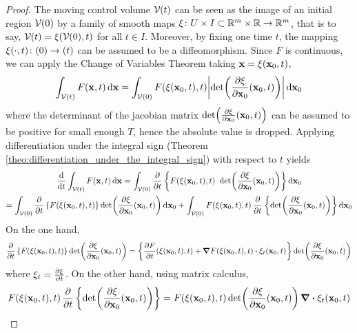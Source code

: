 \begin{proof}
	The moving control volume $\mathcal{V}_{}(t)$ can be seen as the image of an initial region $\mathcal{V}_{}(0)$ by a family of smooth maps $\xi \colon U \times I \subset \mathbb{R}^m \times \mathbb{R} \rightarrow \mathbb{R}^m$, that is to say, $\mathcal{V}_{}(t) = \xi(\mathcal{V}_{}(0),t)$ for all $t \in I$. Moreover, by fixing one time $t$, the mapping $\xi(\cdot, t) \colon \vb{}(0) \rightarrow \vb{}(t)$ can be assumed to be a diffeomorphism. Since $F$ is continuous, we can apply the Change of Variables Theorem taking $\vb{x} = \xi(\vb{x}_0,t)$,
	\begin{equation*}
		\int_{\mathcal{V}(t)} F(\vb{x},t) \dd{\vb{x}} = 
		\int_{\mathcal{V}_{}(0)} F(\xi(\vb{x}_0,t), t) \abs{\det(\frac{\partial \xi}{\partial \vb{x}_0} (\vb{x}_0, t))} \dd{\vb{x}_0}
	\end{equation*}
	where the determinant of the jacobian matrix $\det(\frac{\partial \xi}{\partial \vb{x}_0} (\vb{x}_0, t))$ can be assumed to be positive for small enough $T$, hence the absolute value is dropped. Applying differentiation under the integral sign (Theorem \ref{theo:differentiation_under_the_integral_sign}) with respect to $t$ yields
	\begin{multline*}
		\frac{\dd}{\dd{t}} \int_{\mathcal{V}(t)} F(\vb{x}, t) \dd{\vb{x}} = 
		\int_{\mathcal{V}_{}(0)} \pdv{t} 
		\left\{
		F(\xi(\vb{x}_0,t), t) \ \det(\frac{\partial \xi}{\partial \vb{x}_0} (\vb{x}_0, t))
		\right\}
		\dd{\vb{x}_0} 
		\\
		= 
		\int_{\mathcal{V}_{}(0)} 
		\pdv{t} \left\{ F(\xi(\vb{x}_0,t), t) \right\} \det(\frac{\partial \xi}{\partial \vb{x}_0} (\vb{x}_0, t)) \dd{\vb{x}_0} + 
		\int_{\mathcal{V}_{}(0)} F(\xi(\vb{x}_0,t), t) \, \pdv{t} \left\{ \det(\frac{\partial \xi}{\partial \vb{x}_0} (\vb{x}_0, t)) \right\} \dd{\vb{x}_0}
	\end{multline*}
	On the one hand,
	\begin{equation*}
		\pdv{t} \left\{ F(\xi(\vb{x}_0,t), t) \right\} \det(\frac{\partial \xi}{\partial \vb{x}_0} (\vb{x}_0, t)) = 
		\left\{ 
		\frac{\partial F}{\partial t} (\xi(\vb{x}_0, t), t) + 
		\grad{F(\xi(\vb{x}_0, t), t)} \vdot \xi_t (\vb{x}_0, t)
		\right\}
		\det(\frac{\partial \xi}{\partial \vb{x}_0} (\vb{x}_0, t))
	\end{equation*}
	where $\xi_t = \pdv{\xi}{t}$. On the other hand, using matrix calculus,
	\begin{equation*}
		F(\xi(\vb{x}_0,t), t) \, \pdv{t} \left\{ \det(\frac{\partial \xi}{\partial \vb{x}_0} (\vb{x}_0, t)) \right\} = 
		F(\xi(\vb{x}_0,t), t) \det(\frac{\partial \xi}{\partial \vb{x}_0} (\vb{x}_0, t)) \, \div{\xi_t(\vb{x}_0,t)}

\end{equation*}
\end{proof}
